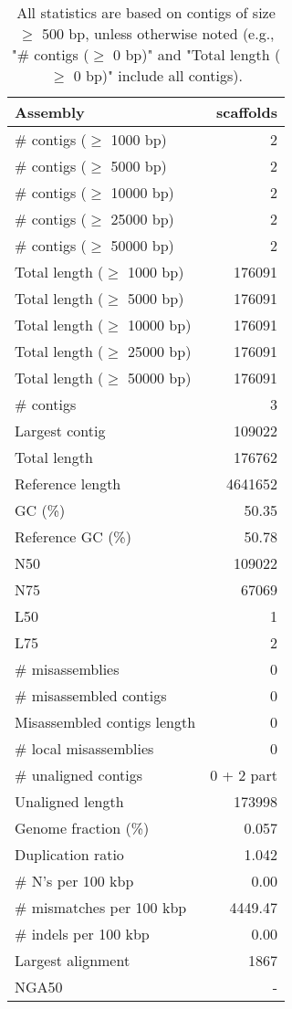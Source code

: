 \documentclass[12pt,a4paper]{article}
\begin{document}
\begin{table}[ht]
\begin{center}
\caption{All statistics are based on contigs of size $\geq$ 500 bp, unless otherwise noted (e.g., "\# contigs ($\geq$ 0 bp)" and "Total length ($\geq$ 0 bp)" include all contigs).}
\begin{tabular}{|l*{1}{|r}|}
\hline
Assembly & scaffolds \\ \hline
\# contigs ($\geq$ 1000 bp) & 2 \\ \hline
\# contigs ($\geq$ 5000 bp) & 2 \\ \hline
\# contigs ($\geq$ 10000 bp) & 2 \\ \hline
\# contigs ($\geq$ 25000 bp) & 2 \\ \hline
\# contigs ($\geq$ 50000 bp) & 2 \\ \hline
Total length ($\geq$ 1000 bp) & 176091 \\ \hline
Total length ($\geq$ 5000 bp) & 176091 \\ \hline
Total length ($\geq$ 10000 bp) & 176091 \\ \hline
Total length ($\geq$ 25000 bp) & 176091 \\ \hline
Total length ($\geq$ 50000 bp) & 176091 \\ \hline
\# contigs & 3 \\ \hline
Largest contig & 109022 \\ \hline
Total length & 176762 \\ \hline
Reference length & 4641652 \\ \hline
GC (\%) & 50.35 \\ \hline
Reference GC (\%) & 50.78 \\ \hline
N50 & 109022 \\ \hline
N75 & 67069 \\ \hline
L50 & 1 \\ \hline
L75 & 2 \\ \hline
\# misassemblies & 0 \\ \hline
\# misassembled contigs & 0 \\ \hline
Misassembled contigs length & 0 \\ \hline
\# local misassemblies & 0 \\ \hline
\# unaligned contigs & 0 + 2 part \\ \hline
Unaligned length & 173998 \\ \hline
Genome fraction (\%) & 0.057 \\ \hline
Duplication ratio & 1.042 \\ \hline
\# N's per 100 kbp & 0.00 \\ \hline
\# mismatches per 100 kbp & 4449.47 \\ \hline
\# indels per 100 kbp & 0.00 \\ \hline
Largest alignment & 1867 \\ \hline
NGA50 & - \\ \hline
\end{tabular}
\end{center}
\end{table}
\end{document}
